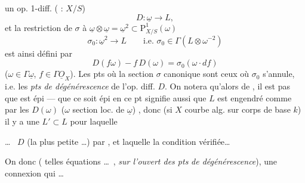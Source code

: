 \documentclass[11pt,a4paper]{article}
\begin{document}
un op. 1-diff. ( : $X/S$)
\[
D : \underline{\omega} \longrightarrow L,
\]
 et la restriction de $\sigma$ à $\underline{\omega}\otimes\underline{\omega} = \underline{\omega}^2 \subset \mathrm{P}^1_{X/S}(\omega)$
\[
\sigma_0 : \underline{\omega}^2 \to L \qquad \text{i.e. } \sigma_0 \in \Gamma(L\otimes\omega^{-2})
\]
est ainsi défini par
\[
D(f\omega) - f\,D(\omega) = \sigma_0(\omega\cdot df)
\]
($\omega\in\Gamma\underline{\omega}$, $f\in\Gamma\underline{O}_X$). Les pts où la section $\sigma$ canonique sont ceux où $\sigma_0$ s'annule, i.e. les \emph{pts de dégénérescence} de l'op. diff. $D$. On notera qu'alors  de , il est  pas  que \uncertain{$\sigma$} est épi --- que ce soit épi en ce pt signifie aussi que $L$ est engendré comme  par les $D(\omega)$ ($\omega$ section loc. de $\underline{\omega}$)    , donc (si $X$ courbe alg. sur corps de base $k$) il y a une \uncertain{\ill{}} \uncertain{\ill{}}  $L'\subset L$  pour laquelle  \ill{}

\ldots\  $D$ (la plus petite \ldots) par \uncertain{\ill{}}, et    laquelle la condition  vérifiée\ldots

On  donc (  telles équations \ldots\ , \emph{sur l'ouvert des pts} \emph{ de dégénérescence}), une connexion   qui \uncertain{\ill{}}   \ldots\ 
\end{document}
